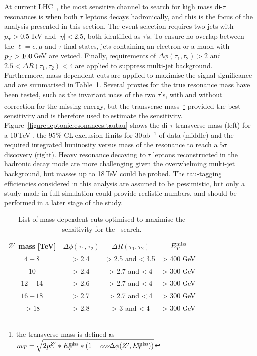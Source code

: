 \documentclass[a4paper,11pt]{article}
\begin{document}
At current LHC~\cite{Khachatryan:2016qkc}, the most sensitive channel to search for high mass di-$\tau$ resonances is when both $\tau$ leptons decays hadronically, and this is the focus of the analysis presented in this section. The event selection requires two jets with $p_{T} > 0.5$\,TeV and $|\eta|<2.5$, both identified as $\tau$'s. To ensure no overlap between the $\ell=e,\mu$ and $\tau$ final states, jets containing an electron or a muon with $p_{\text{T}} > 100$\,GeV are vetoed. Finally, requirements of $\Delta \phi(\tau_1, \tau_2)> 2$ and $2.5<\Delta R(\tau_1, \tau_2)<4$ are applied to suppress multi-jet background. Furthermore, mass dependent cuts are applied to maximise the signal significance and are summarised in Table~\ref{tab:leptonicresonances:tautau}. Several proxies for the true resonance mass have been tested, such as the invariant mass of the two $\tau$'s, with and without correction for the missing energy, but the transverse mass~\footnote{the transverse mass is defined as $m_{T}  =  \sqrt{2p_{\text{T}}^{Z^{\prime}}*E_{T}^{\rm{miss}}*(1-cos\Delta\phi(Z^{\prime},E_{T}^{\rm{miss}}))} $} provided the best sensitivity and is therefore used to estimate the sensitivity.
Figure~\ref{figure:leptonicresonances:tautau} shows the di-$\tau$ transverse mass (left) for a 10\,TeV \ZpSSM, the 95\% CL exclusion limits for 30\,ab$^{-1}$ of data (middle) and the required integrated luminosity versus mass of the resonance to reach a $5\sigma$ discovery (right). Heavy resonance decaying to $\tau$ leptons reconstructed in the hadronic decay mode are more challenging given the overwhelming multi-jet background, but masses up to 18\,TeV could be probed. The tau-tagging efficiencies considered in this analysis are assumed to be pessimistic, but only a study made in full simulation could provide realistic numbers, and should be performed in a later stage of the study.

\begin{table}[htb!]
   \centering
\begin{tabular}{c|c|c|c}
   $Z^{\prime}$ mass [TeV] &  $\Delta \phi(\tau_1, \tau_2)$&  $\Delta R(\tau_1, \tau_2)$ & $E_{T}^{\rm{miss}}$\\
  \hline
  \hline
  $4-8$ & > 2.4 & > 2.5 and < 3.5 & > 400 GeV\\
  $10$ & > 2.4 & > 2.7 and < 4 & > 300 GeV\\
  $12-14$ & > 2.6 & > 2.7 and < 4 & > 300 GeV\\
  $16-18$ & > 2.7 & > 2.7 and < 4 & > 300 GeV\\
  $>18$ & > 2.8 & > 3 and < 4 & > 300 GeV\\
  \end{tabular}
  \caption{List of mass dependent cuts optimised to maximise the sensitivity for the \Zptata\ search.}
  \label{tab:leptonicresonances:tautau}
\end{table}
\end{document}
